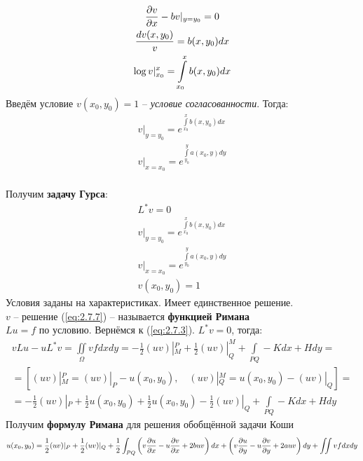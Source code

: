 \documentclass[../main.tex]{subfiles}
\begin{document}
\begin{gather*}
    \frac{\partial v}{\partial x}-bv|_{y=y_0} = 0\\
    \frac{dv(x,y_0)}{v} = b(x,y_0)dx\\
    \log v|_{x_0}^x = \int\limits_{x_0}^x b(x,y_0)dx\\
\end{gather*}
Введём условие $v(x_0,y_0)=1$ -- \textit{условие согласованности}. Тогда:
\begin{gather}
    \label{eq:2.7.5}
    v|_{y=y_0} = e^{\int\limits_{x_0}^x b(x,y_0)dx}\\
    \label{eq:2.7.6}
    v|_{x=x_0} = e^{\int\limits_{y_0}^y a(x_0,y)dy}
\end{gather}
\\
Получим \textbf{задачу Гурса}:
\begin{equation}
    \begin{gathered}
        \label{eq:2.7.7}
        L^*v=0\\
        v|_{y=y_0} = e^{\int\limits_{x_0}^x b(x,y_0)dx}\\
        v|_{x=x_0} = e^{\int\limits_{y_0}^y a(x_0,y)dy}\\
        v(x_0,y_0)=1
    \end{gathered}
\end{equation}
Условия заданы на характеристиках. Имеет единственное решение.
\\
$v$ -- решение (\ref{eq:2.7.7}) -- называется \textbf{функцией Римана}
\\
$Lu=f$ по условию. Вернёмся к (\ref{eq:2.7.3}). $L^*v=0$, тогда:
\begin{gather*}
    vLu - uL^*v = \iint\limits_{\Omega} vfdxdy =
    -\frac{1}{2}(uv)|_M^P + \frac{1}{2}(uv)|_Q^M + \int\limits_{PQ}-Kdx + Hdy =\\=
    \left[(uv)|_M^P = (uv)|_P - u(x_0, y_0), \quad (uv)|_Q^M = u(x_0, y_0) - (uv)|_Q\right] =\\=
    -\frac{1}{2}(uv)|_P +\frac{1}{2} u(x_0, y_0) + \frac{1}{2} u(x_0, y_0) - \frac{1}{2}(uv)|_Q +
    \int\limits_{PQ}-Kdx+Hdy
\end{gather*}
Получим \textbf{формулу Римана} для решения обобщённой задачи Коши
\begin{gather}
    \label{eq:2.7.8}
    u(x_0,y_0) = \frac{1}{2}(uv)|_P + \frac{1}{2}(uv)|_Q+
    \frac{1}{2}\int_{PQ}\left(v\frac{\partial u}{\partial x} - u\frac{\partial v}{\partial x} + 2buv\right)dx +
    \left(v\frac{\partial u}{\partial y} - u\frac{\partial v}{\partial y} + 2auv\right)dy +
    \iint\limits vfdxdy
\end{gather}
\\
\end{document}
